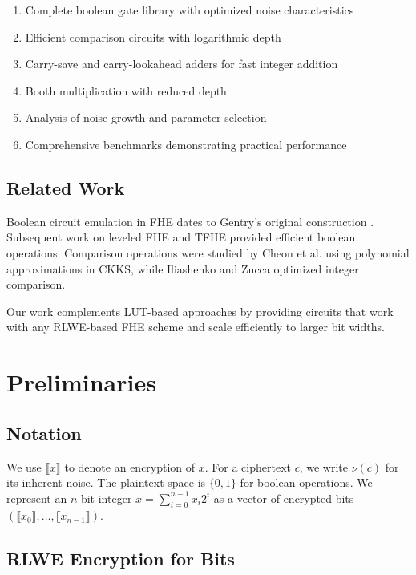 \documentclass[11pt,a4paper]{article}
\begin{document}
\begin{enumerate}
    \item Complete boolean gate library with optimized noise characteristics
    \item Efficient comparison circuits with logarithmic depth
    \item Carry-save and carry-lookahead adders for fast integer addition
    \item Booth multiplication with reduced depth
    \item Analysis of noise growth and parameter selection
    \item Comprehensive benchmarks demonstrating practical performance
\end{enumerate}

\subsection{Related Work}

Boolean circuit emulation in FHE dates to Gentry's original construction \cite{gentry2009fully}. Subsequent work on leveled FHE \cite{brakerski2014leveled} and TFHE \cite{chillotti2020tfhe} provided efficient boolean operations. Comparison operations were studied by Cheon et al. \cite{cheon2019numerical} using polynomial approximations in CKKS, while Iliashenko and Zucca \cite{iliashenko2021faster} optimized integer comparison.

Our work complements LUT-based approaches by providing circuits that work with any RLWE-based FHE scheme and scale efficiently to larger bit widths.

\section{Preliminaries}

\subsection{Notation}

We use $\llbracket x \rrbracket$ to denote an encryption of $x$. For a ciphertext $c$, we write $\nu(c)$ for its inherent noise. The plaintext space is $\{0, 1\}$ for boolean operations. We represent an $n$-bit integer $x = \sum_{i=0}^{n-1} x_i 2^i$ as a vector of encrypted bits $(\llbracket x_0 \rrbracket, \ldots, \llbracket x_{n-1} \rrbracket)$.

\subsection{RLWE Encryption for Bits}
\end{document}
